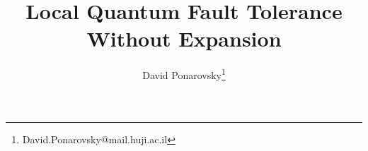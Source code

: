 \documentclass[manuscript,screen,review]{acmart}
\begin{document}

\title{ Local Quantum Fault Tolerance Without Expansion  }
\author{David Ponarovsky\footnote{David.Ponarovsky@mail.huji.ac.il}}
\maketitle

\newcommand*{\xb}{\mathbf{x}}

\ifdefined\SWEEPHEA
\else 
  \newcommand*{\SWEEPHEA}{}
\newcommand{\History}[1]{H_{#1}}
  \newcommand{\Time}[1]{T(#1)}
  \newcommand{\Excuse}[1]{\mathbf{Excuse}(#1)}
  \newcommand{\Excusei}[1]{\mathbf{Excuse}_{i}(#1)}
  \newcommand{\Size}[1]{\mathbf{Size}(#1)}
  \newcommand{\Span}[1]{\mathbf{Span}(#1)}
  \newcommand{\pre}[1]{\text{pre}(#1)}
  \newcommand{\poli}[1]{\text{pole}_{i}(#1)}
  \newcommand{\prei}[1]{\text{pre}_{i}(#1)}
  \newcommand{\predd}[1]{\text{pre}_{d+1}(#1)}
  \newcommand{\rotf}[2]{\theta_{#1 ,#2}}
  \newcommand*{\rotfs}{\rotf{v}{S^{\prime}}}
  \newcommand{\rotfv}[2]{\mathbf{\rotf{#1}{#2} }}
  \newcommand*{\rotfvs}{\mathbf{\rotfs{} }}
\fi

%
%
%
%
\end{document}
